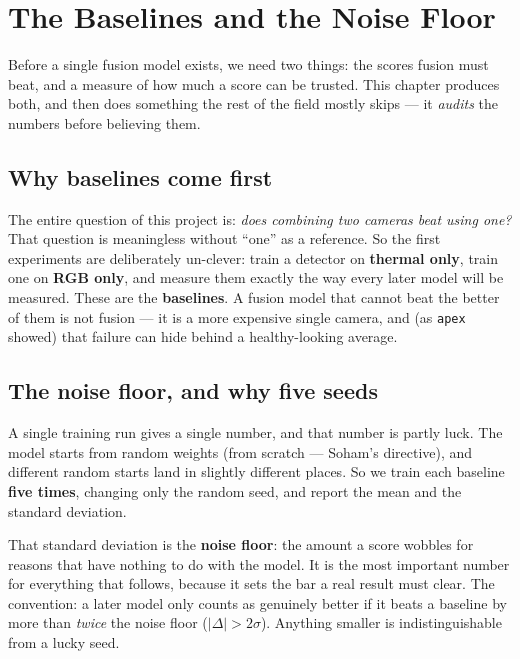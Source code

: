 \documentclass[../main.tex]{subfiles}
\begin{document}
\noindent{}\par\medskip

\chapter{The Baselines and the Noise Floor}

Before a single fusion model exists, we need two things: the scores fusion must beat, and a
measure of how much a score can be trusted. This chapter produces both, and then does something
the rest of the field mostly skips --- it \emph{audits} the numbers before believing them.

\section{Why baselines come first}

The entire question of this project is: \emph{does combining two cameras beat using one?} That
question is meaningless without ``one'' as a reference. So the first experiments are deliberately
un-clever: train a detector on \textbf{thermal only}, train one on \textbf{RGB only}, and measure
them exactly the way every later model will be measured. These are the \textbf{baselines}. A fusion
model that cannot beat the better of them is not fusion --- it is a more expensive single camera,
and (as \texttt{apex} showed) that failure can hide behind a healthy-looking average.

\section{The noise floor, and why five seeds}

A single training run gives a single number, and that number is partly luck. The model starts from
random weights (from scratch --- Soham's directive), and different random starts land in slightly
different places. So we train each baseline \textbf{five times}, changing only the random seed, and
report the mean and the standard deviation.

That standard deviation is the \textbf{noise floor}: the amount a score wobbles for reasons that
have nothing to do with the model. It is the most important number for everything that follows,
because it sets the bar a real result must clear. The convention: a later model only counts as
genuinely better if it beats a baseline by more than \emph{twice} the noise floor
($|\Delta| > 2\sigma$). Anything smaller is indistinguishable from a lucky seed.
\end{document}
